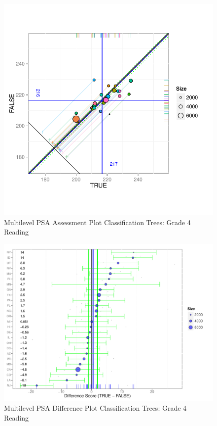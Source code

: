 \begin{figure}[h!]
\begin{center}
\includegraphics[width=\textwidth]{../Figures2009/g4read-mlpsa-ctree-circ.pdf}
\caption{Multilevel PSA Assessment Plot Classification Trees: Grade 4 Reading}
\end{center}
\end{figure}

\begin{figure}[h!]
\begin{center}
\includegraphics[width=\textwidth]{../Figures2009/g4read-mlpsa-ctree-diff.pdf}
\caption{Multilevel PSA Difference Plot Classification Trees: Grade 4 Reading}
\end{center}
\end{figure}


